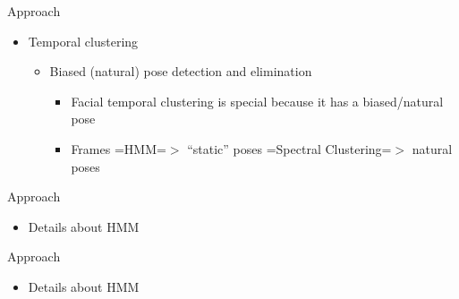 \documentclass[12pt]{beamer}
\begin{document}
\begin{frame}{Approach}
	\begin{itemize}
		\item Temporal clustering
		\begin{itemize}
			\item Biased (natural) pose detection and elimination
			\begin{itemize}
				\item Facial temporal clustering is special because it has a biased/natural pose
				\item Frames =HMM=$>$ ``static'' poses =Spectral Clustering=$>$ natural poses
			\end{itemize}
		\end{itemize}
	\end{itemize}
\end{frame}

\begin{frame}{Approach}
	\begin{itemize}
		\item Details about HMM
		\\  
	\end{itemize}
\end{frame}

\begin{frame}{Approach}
	\begin{itemize}
		\item Details about HMM
		\\  
	\end{itemize}
\end{frame}
\end{document}
